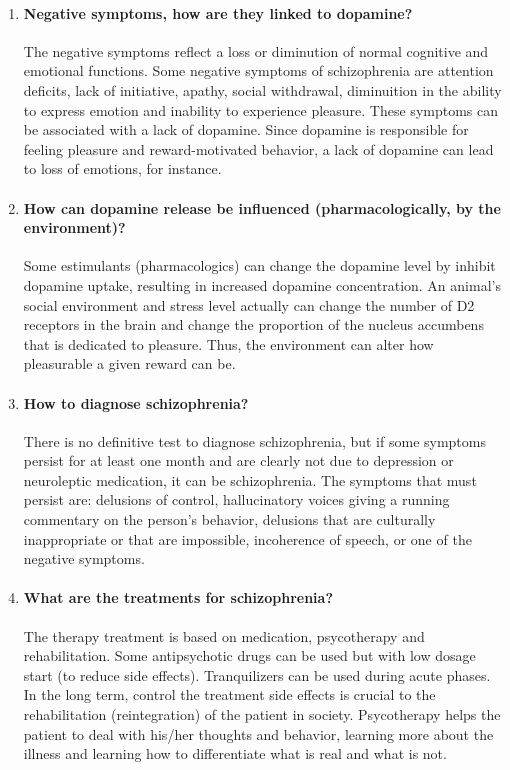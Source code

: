 \documentclass[12pt,article,oneside,a4paper]{memoir}
\begin{document}
\begin{enumerate}
\item \paragraph{Negative symptoms, how are they linked to dopamine?}
The negative symptoms reflect a loss or diminution of normal cognitive and
emotional functions. Some negative symptoms of schizophrenia are attention
deficits, lack of initiative, apathy, social withdrawal, diminuition in the
ability to express emotion and inability to experience pleasure. These
symptoms can be associated with a lack of dopamine. Since dopamine is
responsible for feeling pleasure and reward-motivated behavior, a lack of
dopamine can lead to loss of emotions, for instance.

\item \paragraph{How can dopamine release be influenced (pharmacologically, by
the environment)?}

Some estimulants (pharmacologics) can change the dopamine level by inhibit
dopamine uptake, resulting in increased dopamine concentration. An animal's
social environment and stress level actually can change the number of D2
receptors in the brain and change the proportion of the nucleus accumbens that
is dedicated to pleasure. Thus, the environment can alter how pleasurable a
given reward can be. 

\item \paragraph{How to diagnose schizophrenia?}
There is no definitive test to diagnose schizophrenia, but if some symptoms
persist for at least one month and are clearly not due to depression or
neuroleptic medication, it can be schizophrenia.
The symptoms that must persist are: delusions of control, hallucinatory voices giving a running commentary on the person's behavior, delusions that are culturally inappropriate or that are impossible, incoherence of speech, or one of the negative symptoms.

\item \paragraph{What are the treatments for schizophrenia?}
The therapy treatment is based on medication, psycotherapy and rehabilitation.
Some antipsychotic drugs can be used but with low dosage start (to reduce side
effects). Tranquilizers can be used during acute phases. In the long term,
control the treatment side effects is crucial to the rehabilitation
(reintegration) of the patient in society. Psycotherapy helps the patient to 
deal with his/her thoughts and behavior, learning more about the illness and
learning how to differentiate what is real and what is not.


\end{enumerate}
\end{document}
